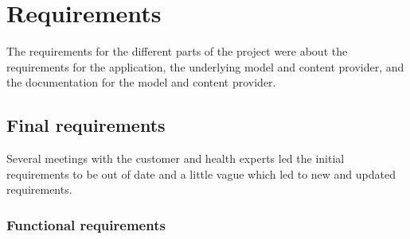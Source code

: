 \chapter{Requirements}
The requirements for the different parts of the project were about the requirements for the application, the underlying model and content provider, and the documentation for the model and content provider. 

\section{Final requirements}
Several meetings with the customer and health experts led the initial requirements to be out of date and a little vague which led to new and updated requirements.

\subsection{Functional requirements}

